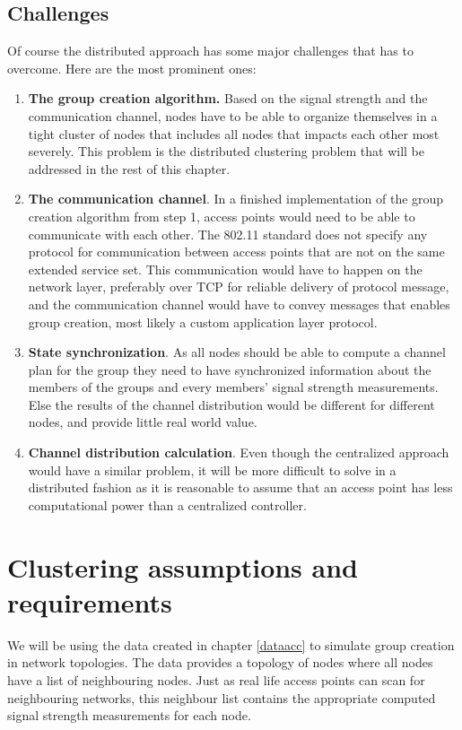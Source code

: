 \subsection{Challenges}
Of course the distributed approach has some major challenges that has to overcome. Here are the most prominent ones: 
\begin{enumerate}
	\item \textbf{The group creation algorithm.} Based on the signal strength and the communication channel, nodes have to be able to organize themselves in a tight cluster of nodes that
		includes all nodes that impacts each other most severely. This problem is the distributed clustering problem that will be addressed in the rest of this chapter.
	\item \textbf{The communication channel}. In a finished implementation of the group creation algorithm from step 1, access points would need to be able to communicate with each other.
		The 802.11 standard does not specify any protocol for communication between access points that are not on the same extended service set.
		This communication would have to happen on the network layer, preferably over TCP for reliable delivery of protocol message, and the communication channel would have to convey messages that enables group creation, most likely a custom application layer protocol. 
	\item \textbf{State synchronization}. As all nodes should be able to compute a channel plan for the group they need to have synchronized information about the members of the groups
		and every members' signal strength measurements. Else the results of the channel distribution would be different for different nodes, and provide little real world value. 
	\item \textbf{Channel distribution calculation}. Even though the centralized approach would have a similar problem, it will be more difficult to solve in a distributed fashion as 
		it is reasonable to assume that an access point has less computational power than a centralized controller.
\end{enumerate}


\section{Clustering assumptions and requirements}
We will be using the data created in chapter \ref{dataacc} to simulate group creation in network topologies. The data provides a topology of nodes where all nodes have a list of neighbouring nodes.
Just as real life access points can scan for neighbouring networks, this neighbour list contains the appropriate computed signal strength measurements for each node.

